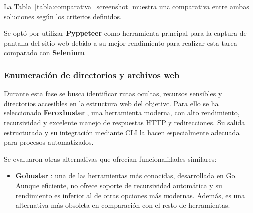 \begin{parskipenv}
La Tabla~\ref{tabla:comparativa_screenshot} muestra una comparativa entre ambas soluciones según los criterios definidos.

\begin{table}[H]
\centering
\renewcommand{\arraystretch}{1.4}
\caption{Comparativa de herramientas para la captura automatizada de sitios web.}
\label{tabla:comparativa_screenshot}
\end{table}

Se optó por utilizar \textbf{Pyppeteer} como herramienta principal para la captura de pantalla del sitio web debido a su mejor rendimiento para realizar esta tarea comparado con \textbf{Selenium}.

\subsubsection*{Enumeración de directorios y archivos web}
Durante esta fase se busca identificar rutas ocultas, recursos sensibles y directorios accesibles en la estructura web del objetivo. Para ello se ha seleccionado \textbf{Feroxbuster} \cite{feroxbuster}, una herramienta moderna, con alto rendimiento, recursividad y excelente manejo de respuestas HTTP y redirecciones. Su salida estructurada y su integración mediante CLI la hacen especialmente adecuada para procesos automatizados.

Se evaluaron otras alternativas que ofrecían funcionalidades similares:

\begin{itemize}
    \item \textbf{Gobuster} \cite{gobuster}: una de las herramientas más conocidas, desarrollada en Go. Aunque eficiente, no ofrece soporte de recursividad automática y su rendimiento es inferior al de otras opciones más modernas. Además, es una alternativa más obsoleta en comparación con el resto de herramientas.


\end{itemize}
\end{parskipenv}
